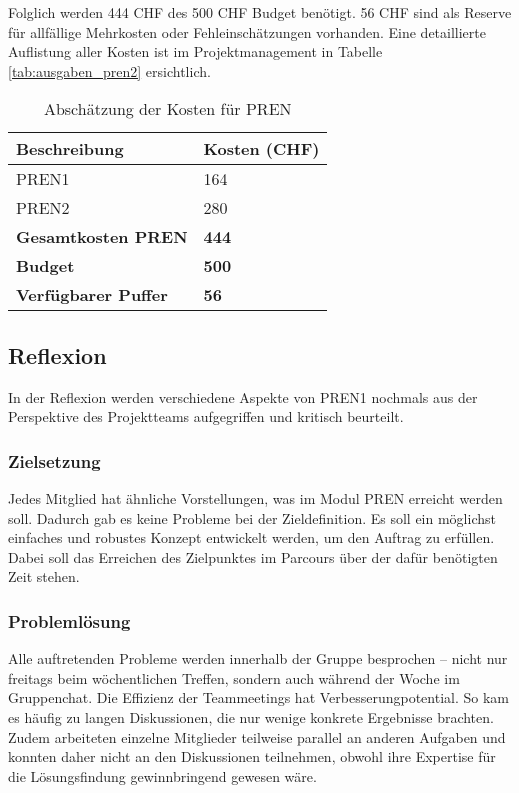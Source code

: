 \documentclass[../main.tex]{subfiles}
\begin{document}
Folglich werden 444 CHF des 500 CHF Budget benötigt. 56 CHF sind als Reserve für allfällige Mehrkosten oder Fehleinschätzungen vorhanden. Eine detaillierte Auflistung aller Kosten ist im Projektmanagement in Tabelle \ref{tab:ausgaben_pren2} ersichtlich.

\begin{table}[h!]
    \centering
    \begin{tabular}{|p{5cm}|p{3cm}|}
        \hline
        \textbf{Beschreibung} & \textbf{Kosten (CHF)} \\
        \hline
        PREN1 & 164 \\
        \hline
        PREN2 & 280 \\
        \hline
        \textbf{Gesamtkosten PREN} & \textbf{444} \\
        \hline
        \textbf{Budget} & \textbf{500} \\
        \hline
        \textbf{Verfügbarer Puffer} & \textbf{56} \\
        \hline
    \end{tabular}
    \caption{Abschätzung der Kosten für PREN}
    \label{tab:kostenuebersicht}
\end{table}

\subsection{Reflexion}
In der Reflexion werden verschiedene Aspekte von PREN1 nochmals aus der Perspektive des Projektteams aufgegriffen und kritisch beurteilt.

\subsubsection{Zielsetzung}
Jedes Mitglied hat ähnliche Vorstellungen, was im Modul PREN erreicht werden soll. Dadurch gab es keine Probleme bei der Zieldefinition. Es soll ein möglichst einfaches und robustes Konzept entwickelt werden, um den Auftrag zu erfüllen. Dabei soll das Erreichen des Zielpunktes im Parcours über der dafür benötigten Zeit stehen.

\subsubsection{Problemlösung}
Alle auftretenden Probleme werden innerhalb der Gruppe besprochen – nicht nur freitags beim wöchentlichen Treffen, sondern auch während der Woche im Gruppenchat. Die Effizienz der Teammeetings hat Verbesserungpotential. So kam es häufig zu langen Diskussionen, die nur wenige konkrete Ergebnisse brachten. Zudem arbeiteten einzelne Mitglieder teilweise parallel an anderen Aufgaben und konnten daher nicht an den Diskussionen teilnehmen, obwohl ihre Expertise für die Lösungsfindung gewinnbringend gewesen wäre.
\end{document}
